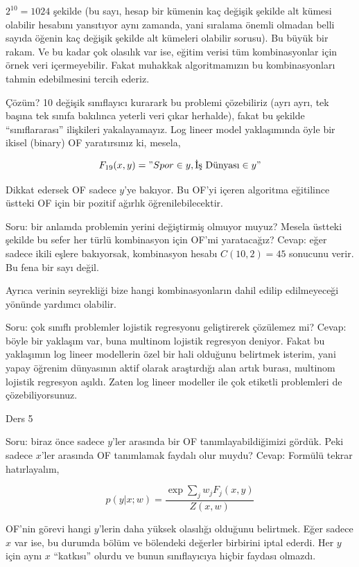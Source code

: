\documentclass[12pt,fleqn]{article}\usepackage{../../common}
\begin{document}
$2^{10} = 1024$ şekilde (bu sayı, hesap bir kümenin kaç değişik şekilde alt
kümesi olabilir hesabını yansıtıyor aynı zamanda, yani sıralama önemli
olmadan belli sayıda öğenin kaç değişik şekilde alt kümeleri olabilir
sorusu). Bu büyük bir rakam. Ve bu kadar çok olasılık var ise, eğitim
verisi tüm kombinasyonlar için örnek veri içermeyebilir. Fakat muhakkak
algoritmamızın bu kombinasyonları tahmin edebilmesini tercih ederiz.

Çözüm? 10 değişik sınıflayıcı kurarark bu problemi çözebiliriz (ayrı ayrı,
tek başına tek sınıfa bakılınca yeterli veri çıkar herhalde), fakat bu
şekilde ``sınıflararası'' ilişkileri yakalayamayız. Log lineer model
yaklaşımında öyle bir ikisel (binary) OF yaratırsınız ki, mesela,

$$F_{19}(x,y) = "Spor \in y, \textrm{İş Dünyası} \in y" $$ 

Dikkat edersek OF sadece $y$'ye bakıyor. Bu OF'yi içeren algoritma
eğitilince üstteki OF için bir pozitif ağırlık öğrenilebilecektir. 

Soru: bir anlamda problemin yerini değiştirmiş olmuyor muyuz? Mesela
üstteki şekilde bu sefer her türlü kombinasyon için OF'mi yaratacağız?
Cevap: eğer sadece ikili eşlere bakıyorsak, kombinasyon hesabı 
$C(10,2) = 45$ sonucunu verir. Bu fena bir sayı değil.

Ayrıca verinin seyrekliği bize hangi kombinasyonların dahil edilip
edilmeyeceği yönünde yardımcı olabilir. 

Soru: çok sınıflı problemler lojistik regresyonu geliştirerek çözülemez mi?
Cevap: böyle bir yaklaşım var, buna multinom lojistik regresyon
deniyor. Fakat bu yaklaşımın log lineer modellerin özel bir hali olduğunu
belirtmek isterim, yani yapay öğrenim dünyasının aktif olarak araştırdığı
alan artık burası, multinom lojistik regresyon aşıldı. Zaten log lineer
modeller ile çok etiketli problemleri de çözebiliyorsunuz.

Ders 5

Soru: biraz önce sadece $y$'ler arasında bir OF tanımlayabildiğimizi
gördük. Peki sadece $x$'ler arasında OF tanımlamak faydalı olur muydu?
Cevap: Formülü tekrar hatırlayalım,

$$ p(y|x;w) = \frac{\exp \sum_j w_j F_j (x,y)}{Z(x,w)} $$

OF'nin görevi hangi $y$'lerin daha yüksek olasılığı olduğunu
belirtmek. Eğer sadece $x$ var ise, bu durumda bölüm ve bölendeki değerler
birbirini iptal ederdi. Her $y$ için aynı $x$ ``katkısı'' olurdu ve bunun
sınıflayıcıya hiçbir faydası olmazdı. 
\end{document}
